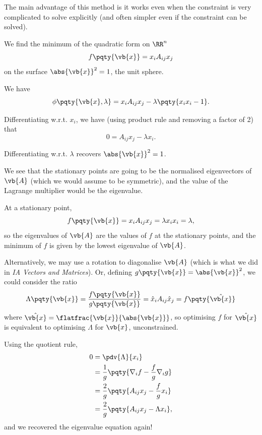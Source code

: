 The main advantage of this method is it works even when the constraint is very complicated to solve explicitly (and often simpler even if the constraint can be solved).

\begin{example}
    \label{ex:optimising-quadratic-form}%
    We find the minimum of the quadratic form on \(\RR^n\)
    \[
        f\pqty{\vb{x}} = x_i A_{ij} x_j
    \]
    on the surface \(\abs{\vb{x}}^2 = 1\), the unit sphere.

    We have
    \[
        \phi\pqty{\vb{x}, \lambda} = x_i A_{ij} x_j - \lambda \pqty{x_i x_i - 1}.
    \]

    Differentiating w.r.t. \(x_i\), we have (using product rule and removing a factor of 2) that
    \[
        0 = A_{ij} x_j - \lambda x_i.
    \]

    Differentiating w.r.t. \(\lambda\) recovers \(\abs{\vb{x}}^2 = 1\).

    We see that the stationary points are going to be the normalised eigenvectors of \(\vb{A}\) (which we would assume to be symmetric), and the value of the Lagrange multiplier would be the eigenvalue.

    At a stationary point,
    \[
        f\pqty{\vb{x}} = x_i A_{ij} x_j = \lambda x_i x_i = \lambda,
    \]
    so the eigenvalues of \(\vb{A}\) are the values of \(f\) at the stationary points, and the minimum of \(f\) is given by the lowest eigenvalue of \(\vb{A}\).

    Alternatively, we may use a rotation to diagonalise \(\vb{A}\) (which is what we did in \textit{IA Vectors and Matrices}). Or, defining \(g\pqty{\vb{x}} = \abs{\vb{x}}^2\), we could consider the ratio
    \[
        \Lambda\pqty{\vb{x}} = \frac{f\pqty{\vb{x}}}{g\pqty{\vb{x}}} = \hat{x}_i A_{ij} \hat{x}_j = f\pqty{\hat{\vb{x}}}
    \]
    where \(\hat{\vb{x}} = \flatfrac{\vb{x}}{\abs{\vb{x}}}\), so optimising \(f\) for \(\hat{\vb{x}}\) is equivalent to optimising \(\Lambda\) for \(\vb{x}\), unconstrained.

    Using the quotient rule,
    \begin{align*}
        0 &= \pdv{\Lambda}{x_i} \\
        &= \frac{1}{g} \pqty{\nabla_i f - \frac{f}{g} \nabla_i g} \\
        &= \frac{2}{g} \pqty{A_{ij} x_j - \frac{f}{g} x_i} \\
        &= \frac{2}{g} \pqty{A_{ij} x_j - \Lambda x_i},
    \end{align*}
    and we recovered the eigenvalue equation again!
\end{example}

